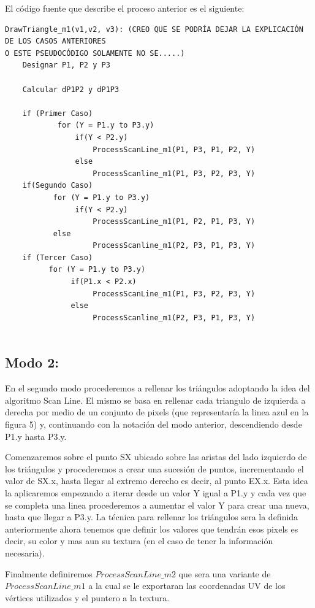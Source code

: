 \documentclass[a4paper]{article}
\newcounter{col}
\begin{document}
El código fuente que describe el proceso anterior es el siguiente:
\begin{verbatim}
DrawTriangle_m1(v1,v2, v3): (CREO QUE SE PODRÍA DEJAR LA EXPLICACIÓN DE LOS CASOS ANTERIORES 
O ESTE PSEUDOCÓDIGO SOLAMENTE NO SE.....)
    Designar P1, P2 y P3 
    
    Calcular dP1P2 y dP1P3
    
    if (Primer Caso)
            for (Y = P1.y to P3.y)      
                if(Y < P2.y)
                    ProcessScanLine_m1(P1, P3, P1, P2, Y)
                else
                    ProcessScanline_m1(P1, P3, P2, P3, Y)
    if(Segundo Caso)
           for (Y = P1.y to P3.y)       
                if(Y < P2.y)
                    ProcessScanLine_m1(P1, P2, P1, P3, Y)
           else
                    ProcessScanline_m1(P2, P3, P1, P3, Y)
    if (Tercer Caso)    
          for (Y = P1.y to P3.y)        
               if(P1.x < P2.x)
                    ProcessScanLine_m1(P1, P3, P2, P3, Y)
               else
                    ProcessScanline_m1(P2, P3, P1, P3, Y)
                                        
\end{verbatim}

 

\subsection{Modo 2:} 


\par En el segundo modo procederemos a rellenar los triángulos adoptando la idea del algoritmo Scan Line. El mismo se basa en rellenar cada triangulo de izquierda a derecha por medio de un conjunto de pixels (que representaría la linea azul en la figura 5) y, continuando con la notación del modo anterior, descendiendo desde P1.y hasta P3.y.  
\par Comenzaremos sobre el punto SX ubicado sobre las aristas del lado izquierdo de los triángulos y procederemos a crear una sucesión de puntos, incrementando el valor de SX.x, hasta llegar al extremo derecho es decir, al punto EX.x. Esta idea la aplicaremos empezando a iterar desde un valor Y igual a P1.y y cada vez que se completa una linea procederemos a aumentar el valor Y para crear una nueva, hasta que llegar a P3.y. 
La técnica para rellenar los triángulos sera la definida anteriormente ahora tenemos que definir los valores que tendrán esos pixels es decir, su color y mas aun su textura (en el caso de tener la información necesaria).
\par Finalmente definiremos $ProcessScanLine\_m2$ que sera una variante de $ProcessScanLine\_m1$ a la cual se le exportaran las coordenadas UV de los vértices utilizados y el puntero a la textura.
 
\end{document}
